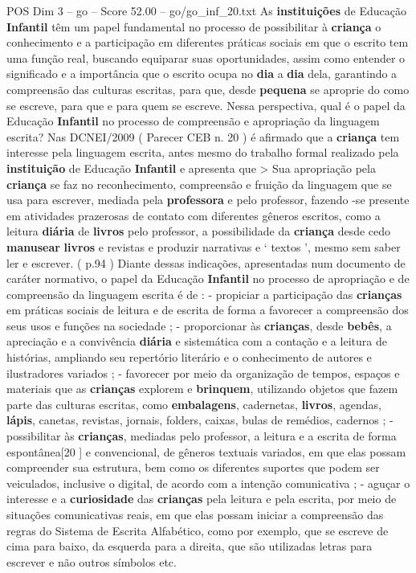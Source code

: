 \begin{textsample}{POS Dim 3 – go – Score 52.00 – go/go\_inf\_20.txt}
As \textbf{instituições} de Educação \textbf{Infantil} têm um papel fundamental no processo de possibilitar à \textbf{criança} o conhecimento e a participação em diferentes práticas sociais em que o escrito tem uma função real, buscando equiparar suas oportunidades, assim como entender o significado e a importância que o escrito ocupa no \textbf{dia} a \textbf{dia} dela, garantindo a compreensão das culturas escritas, para que, desde \textbf{pequena} se aproprie do como se escreve, para que e para quem se escreve.
Nessa perspectiva, qual é o papel da Educação \textbf{Infantil} no processo de compreensão e apropriação da linguagem escrita?
Nas DCNEI/2009 ( Parecer CEB n. 20 ) é afirmado que a \textbf{criança} tem interesse pela linguagem escrita, antes mesmo do trabalho formal realizado pela \textbf{instituição} de Educação \textbf{Infantil} e apresenta que > Sua apropriação pela \textbf{criança} se faz no reconhecimento, compreensão e fruição da linguagem que se usa para escrever, mediada pela \textbf{professora} e pelo professor, fazendo -se presente em atividades prazerosas de contato com diferentes gêneros escritos, como a leitura \textbf{diária} de \textbf{livros} pelo professor, a possibilidade da \textbf{criança} desde cedo \textbf{manusear} \textbf{livros} e revistas e produzir narrativas e ‘ textos ’, mesmo sem saber ler e escrever. ( p.94 ) Diante dessas indicações, apresentadas num documento de caráter normativo, o papel da Educação \textbf{Infantil} no processo de apropriação e de compreensão da linguagem escrita é de : - propiciar a participação das \textbf{crianças} em práticas sociais de leitura e de escrita de forma a favorecer a compreensão dos seus usos e funções na sociedade ; - proporcionar às \textbf{crianças}, desde \textbf{bebês}, a apreciação e a convivência \textbf{diária} e sistemática com a contação e a leitura de histórias, ampliando seu repertório literário e o conhecimento de autores e ilustradores variados ; - favorecer por meio da organização de tempos, espaços e materiais que as \textbf{crianças} explorem e \textbf{brinquem}, utilizando objetos que fazem parte das culturas escritas, como \textbf{embalagens}, cadernetas, \textbf{livros}, agendas, \textbf{lápis}, canetas, revistas, jornais, folders, caixas, bulas de remédios, cadernos ; - possibilitar às \textbf{crianças}, mediadas pelo professor, a leitura e a escrita de forma espontânea[20 ] e convencional, de gêneros textuais variados, em que elas possam compreender sua estrutura, bem como os diferentes suportes que podem ser veiculados, inclusive o digital, de acordo com a intenção comunicativa ; - aguçar o interesse e a \textbf{curiosidade} das \textbf{crianças} pela leitura e pela escrita, por meio de situações comunicativas reais, em que elas possam iniciar a compreensão das regras do Sistema de Escrita Alfabético, como por exemplo, que se escreve de cima para baixo, da esquerda para a direita, que são utilizadas letras para escrever e não outros símbolos etc.

\end{textsample}
